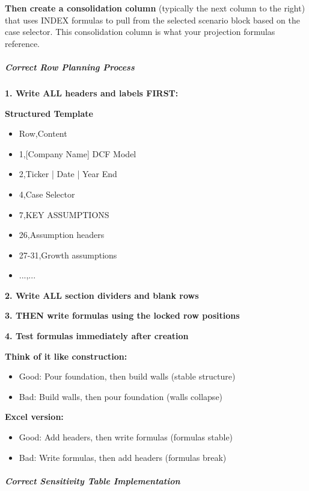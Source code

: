 \documentclass[11pt]{article}
\begin{document}
\textbf{Then create a consolidation column} (typically the next column to the right) that uses INDEX formulas to pull from the selected scenario block based on the case selector. This consolidation column is what your projection formulas reference.


\subparagraph{Correct Row Planning Process}\mbox{}\par

\textbf{1. Write ALL headers and labels FIRST:}

\textbf{Structured Template}
\begin{itemize}[leftmargin=*,itemsep=2pt,topsep=2pt]
\item {} Row,Content
\item {} 1,[Company Name] DCF Model
\item {} 2,Ticker | Date | Year End
\item {} 4,Case Selector
\item {} 7,KEY ASSUMPTIONS
\item {} 26,Assumption headers
\item {} 27-31,Growth assumptions
\item {} ...,...
\end{itemize}

\textbf{2. Write ALL section dividers and blank rows}


\textbf{3. THEN write formulas using the locked row positions}


\textbf{4. Test formulas immediately after creation}


\textbf{Think of it like construction:}

\begin{itemize}[leftmargin=*,itemsep=2pt,topsep=2pt]
\item {} Good: Pour foundation, then build walls (stable structure)
\item {} Bad: Build walls, then pour foundation (walls collapse)
\end{itemize}

\textbf{Excel version:}

\begin{itemize}[leftmargin=*,itemsep=2pt,topsep=2pt]
\item {} Good: Add headers, then write formulas (formulas stable)
\item {} Bad: Write formulas, then add headers (formulas break)
\end{itemize}

\subparagraph{Correct Sensitivity Table Implementation}\mbox{}\par
\end{document}
